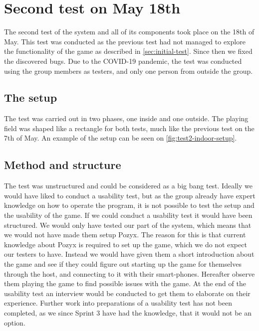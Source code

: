 \section{Second test on May 18th}
The second test of the system and all of its components took place on the 18th of May.
This test was conducted as the previous test had not managed to explore the functionality of the game as described in \autoref{sec:initial-test}.
Since then we fixed the discovered bugs.
Due to the COVID-19 pandemic, the test was conducted using the group members as testers, and only one person from outside the group.

\subsection{The setup}
The test was carried out in two phases, one inside and one outside.
The playing field was shaped like a rectangle for both tests, much like the previous test on the 7th of May.
An example of the setup can be seen on \autoref{fig:test2-indoor-setup}.

\subsection{Method and structure}
The test was unstructured and could be considered as a big bang test.
Ideally we would have liked to conduct a usability test, but as the group already have expert knowledge on how to operate the program, it is not possible to test the setup and the usability of the game.
If we could conduct a usability test it would have been structured.
We would only have tested our part of the system, which means that we would not have made them setup Pozyx.
The reason for this is that current knowledge about Pozyx is required to set up the game, which we do not expect our testers to have.
Instead we would have given them a short introduction about the game and see if they could figure out starting up the game for themselves through the host, and connecting to it with their smart-phones.
Hereafter observe them playing the game to find possible issues with the game.
At the end of the usability test an interview would be conducted to get them to elaborate on their experience.
Further work into preparations of a usability test has not been completed, as we since Sprint 3 have had the knowledge, that it would not be an option.

